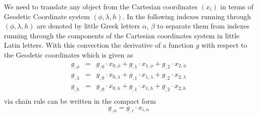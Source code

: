 We need to translate any object from the Cartesian coordinates $(x_i)$ in terms of Geodetic Coordinate system
$(\phi, \lambda, h)$. In the following indexes running through $(\phi, \lambda, h)$ are denoted by little Greek letters $\alpha$, 
$\beta$
to separate them from indexes running through the components of the Cartesian coordinates system in little Latin letters.
With this convection the derivative of a function $g$ with respect to the Geodetic coordinates which is given as
\begin{equation}
\begin{array}{rcl}
  g_{,\phi} & =  & g_{,0} \cdot x_{0,\phi} + g_{,1} \cdot x_{1,\phi} + g_{,2} \cdot x_{2,\phi} \\
  g_{,\lambda} & =  & g_{,0} \cdot x_{0,\lambda} + g_{,1} \cdot x_{1,\lambda} + g_{,2} \cdot x_{2,\lambda} \\  
  g_{,h} & =  & g_{,0} \cdot x_{0,h} + g_{,1} \cdot x_{1,h} + g_{,2} \cdot x_{2,h} \\
\end{array}
\end{equation}
via chain rule can be written in the compact form 
\begin{equation}
  g_{,\alpha}   =    g_{,i} \cdot x_{i,\alpha} 
\end{equation}

